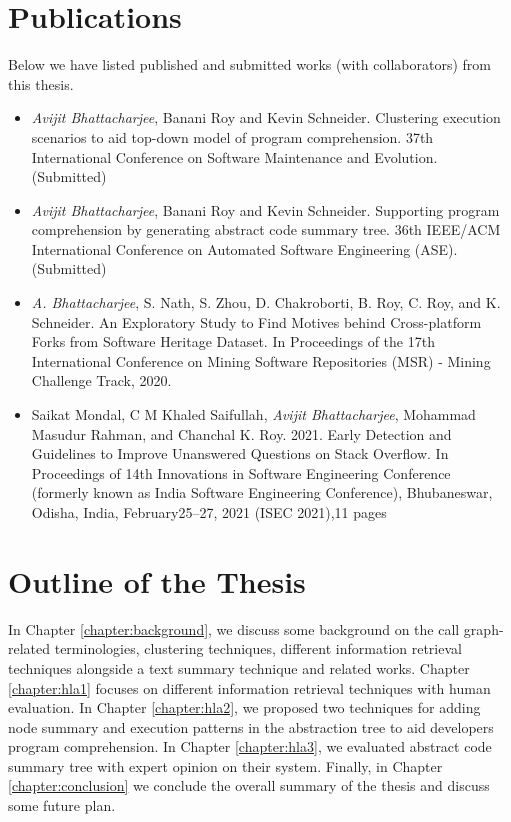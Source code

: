 
\section{Publications}

Below we have listed published and submitted works (with collaborators) from this thesis. 

\begin{itemize}
    \item \emph{Avijit Bhattacharjee}, Banani Roy and Kevin Schneider. Clustering execution scenarios to aid top-down
model of program comprehension. 37th International Conference on Software Maintenance and Evolution. (Submitted)
    \item \emph{Avijit Bhattacharjee}, Banani Roy and Kevin Schneider. Supporting program comprehension by generating abstract code summary tree. 36th IEEE/ACM International Conference on Automated Software Engineering (ASE). (Submitted)
    \item \emph{A. Bhattacharjee}, S. Nath, S. Zhou, D. Chakroborti, B. Roy, C. Roy, and K. Schneider. An Exploratory Study to Find Motives behind Cross-platform Forks from Software Heritage Dataset. In Proceedings of the 17th International Conference on Mining Software Repositories (MSR) - Mining Challenge Track, 2020.
    \item Saikat Mondal, C M Khaled Saifullah, \emph{Avijit Bhattacharjee}, Mohammad Masudur Rahman, and Chanchal K. Roy. 2021. Early Detection and Guidelines to Improve Unanswered Questions on Stack Overflow. In Proceedings of 14th Innovations in Software Engineering Conference (formerly known as India Software Engineering Conference), Bhubaneswar, Odisha, India, February25–27, 2021 (ISEC 2021),11 pages
    
    
\end{itemize}

\section{Outline of the Thesis}
\label{intro:outline}

In Chapter \ref{chapter:background}, we discuss some background on the call graph-related terminologies, clustering techniques, different information retrieval techniques alongside a text summary technique and related works. Chapter \ref{chapter:hla1} focuses on different information retrieval techniques with human evaluation. In Chapter \ref{chapter:hla2}, we proposed two techniques for adding node summary and execution patterns in the abstraction tree to aid developers program comprehension. In Chapter \ref{chapter:hla3}, we evaluated abstract code summary tree with expert opinion on their system. Finally, in Chapter \ref{chapter:conclusion} we conclude the overall summary of the thesis and discuss some future plan. 